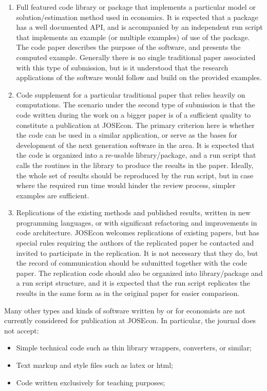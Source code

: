 \begin{enumerate}

\item Full featured code library or package that implements a particular model or 
solution/estimation method used in economics.
It is expected that a package has a well documented API, and is accompanied by
an independent run script that implements an example (or multiple examples) of use
of the package.
The code paper describes the purpose of the software, and presents the computed 
example.
Generally there is no single traditional paper associated with this type of submission, 
but is it understood that the research applications of the software would follow and build
on the provided examples.

\item Code supplement for a particular traditional paper that relies heavily on computations.
The scenario under the second type of submission is that the code written during the work
on a bigger paper is of a sufficient quality to constitute a publication at JOSEcon.
The primary criterion here is whether the code can be used in a similar application, or
serve as the bases for development of the next generation software in the area.
It is expected that the code is organized into a re-usable library/package, and a run
script that calls the routines in the library to produce the results in the paper.
Ideally, the whole set of results should be reproduced by the run script, but 
in case where the required run time would hinder the review process, simpler examples
are sufficient.

\item Replications of the existing methods and published results, written in new
programming languages, or with significant refactoring and improvements in code architecture.
JOSEcon welcomes replications of existing papers, but has special rules requiring
the authors of the replicated paper be contacted and invited to participate in the 
replication.  It is not necessary that they do, but the record of communication should
be submitted together with the code paper.
The replication code should also be organized into library/package and a run script
structure, and it is expected that the run script replicates the results in the same
form as in the original paper for easier comparison.

\end{enumerate}

Many other types and kinds of software written by or for economists are not currently
considered for publication at JOSEcon. 
In particular, the journal does not accept:
\begin{itemize}
\item Simple technical code such as thin library wrappers, converters, or similar;
\item Text markup and style files such as latex or html;
\item Code written exclusively for teaching purposes; 
\end{itemize}


